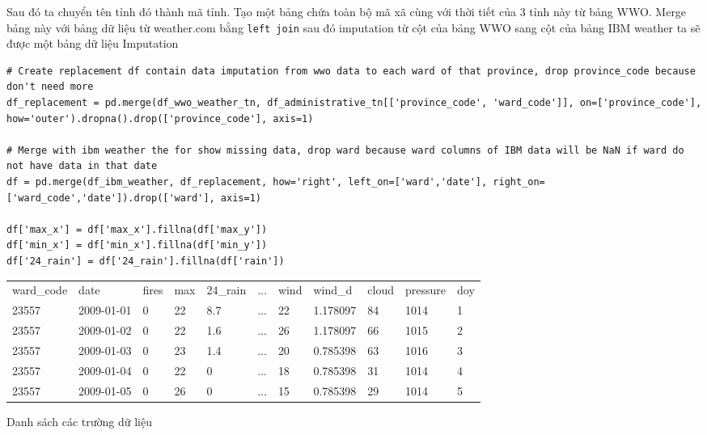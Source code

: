 \documentclass{article}
\begin{document}
Sau đó ta chuyển tên tỉnh đó thành mã tỉnh. Tạo một bảng chứa toàn bộ mã xã cùng với thời tiết của 3 tỉnh này từ bảng WWO. Merge bảng này với bảng dữ liệu từ weather.com bằng \texttt{left join} sau đó imputation từ cột của bảng WWO sang cột của bảng IBM weather ta sẽ được một bảng dữ liệu Imputation
\begin{verbatim}
# Create replacement df contain data imputation from wwo data to each ward of that province, drop province_code because don't need more
df_replacement = pd.merge(df_wwo_weather_tn, df_administrative_tn[['province_code', 'ward_code']], on=['province_code'], how='outer').dropna().drop(['province_code'], axis=1)

# Merge with ibm weather the for show missing data, drop ward because ward columns of IBM data will be NaN if ward do not have data in that date
df = pd.merge(df_ibm_weather, df_replacement, how='right', left_on=['ward','date'], right_on=['ward_code','date']).drop(['ward'], axis=1)

df['max_x'] = df['max_x'].fillna(df['max_y'])
df['min_x'] = df['min_x'].fillna(df['min_y'])
df['24_rain'] = df['24_rain'].fillna(df['rain'])
\end{verbatim}

\begin{table}[H]
	\begin{tabular}{lllllllllll}
		ward\_code & date       & fires & max & 24\_rain & ... & wind & wind\_d  & cloud & pressure & doy \\
		23557      & 2009-01-01 & 0     & 22  & 8.7      & ... & 22   & 1.178097 & 84    & 1014     & 1   \\
		23557      & 2009-01-02 & 0     & 22  & 1.6      & ... & 26   & 1.178097 & 66    & 1015     & 2   \\
		23557      & 2009-01-03 & 0     & 23  & 1.4      & ... & 20   & 0.785398 & 63    & 1016     & 3   \\
		23557      & 2009-01-04 & 0     & 22  & 0        & ... & 18   & 0.785398 & 31    & 1014     & 4   \\
		23557      & 2009-01-05 & 0     & 26  & 0        & ... & 15   & 0.785398 & 29    & 1014     & 5
	\end{tabular}
\end{table}

Danh sách các trường dữ liệu
\end{document}
